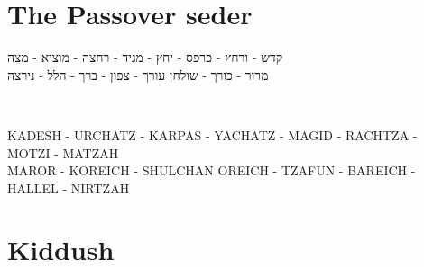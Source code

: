 \documentclass[extrafontsizes,twoside,17pt,a4paper,openany]{memoir}
\newcommand{\CH}{CH}
\newenvironment{HgHebrew}{\begin{hebrew}\noindent\large}{\end{hebrew}}
\newenvironment{HgTranslit}{\strut\\\noindent\begin{itshape}}{\end{itshape}\vspace{1em}}
\begin{document}
\newpage

\phantom{Deliberately blank}
\thispagestyle{empty}

\newpage
\setcounter{page}{1}
\maketitle


\chapter{The Passover seder}

\vfill

\vspace{-2em}
\begin{HgHebrew}
  \begin{center}
  קדש 
  -
  ורחץ
  -
  כרפס 
  -
  יחץ 
  -
  מגיד 
  -
  רחצה 
  -
  מוציא
  -
  מצה 
  \\
  מרור 
  -
  כורך 
  -
  שולחן עורך 
  -
  צפון
  -
  ברך 
  -
  הלל 
  -
  נירצה 
  \end{center}
\end{HgHebrew}
\vspace{-3em}
\begin{HgTranslit}
  \begin{center}
  {\small 
    KADESH - UR{\CH}ATZ - KARPAS - YA{\CH}ATZ - %
    MAGID - RA{\CH}TZA - MOTZI - MATZAH \\ 
    MAROR - KOREI{\CH} - SHUL{\CH}AN OREI{\CH} - %
    TZAFUN - BAREI{\CH} - HALLEL - NIRTZAH}
  \end{center}
\end{HgTranslit}



\newpage

{\small

\tableofcontents*
}
\newpage
{}
\setcounter{page}{1}


\chapter{Kiddush}



%
\end{document}
